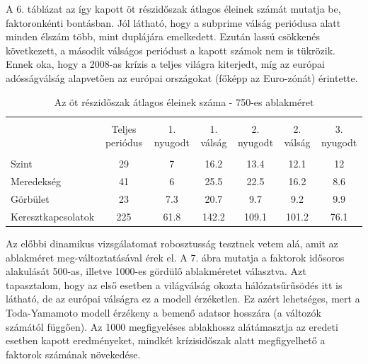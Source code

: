 \documentclass[12pt,bibliography=totoc]{article}
\begin{document}
A 6. táblázat az így kapott öt részidőszak átlagos éleinek számát mutatja be, faktoronkénti bontásban. Jól látható, hogy a subprime válság periódusa alatt minden élszám több, mint duplájára emelkedett. Ezután lassú csökkenés következett, a második válságos periódust a kapott számok nem is tükrözik. Ennek oka, hogy a 2008-as krízis a teljes világra kiterjedt, míg az európai adósságválság alapvetően az európai országokat (főképp az Euro-zónát) érintette. 


\begin{table}[H]
\caption{Az öt részidőszak átlagos éleinek száma - 750-es ablakméret} %
\fontsize{10}{10}\selectfont
\centering%
\begin{tabular}{l | cccccc}%
\hline\hline \\ [-1.5ex]                         %


		& 	Teljes periódus  &	1. nyugodt	&	1. válság& 	2. nyugodt& 	2. válság&	 3. nyugodt \\
\hline \\ [-1.5ex]  
Szint	&		29	&	7	&	16.2	&	13.4	&  	12.1	&	 12\\
Meredekség	&		41	&	6	&	25.5	&	22.5	& 	16.2	& 	8.6\\
Görbület	&	23	&	7.3	&	20.7	&	9.7	& 	9.2	&	 9.9\\
Keresztkapcsolatok	&		225	&	61.8	&	142.2	&	109.1	& 	101.2	& 	76.1\\

\hline            
\end{tabular}
\label{table:nonlin}%
\end{table}

Az előbbi dinamikus vizsgálatomat robosztusság tesztnek vetem alá, amit az ablakméret meg-változtatásával érek el. A 7. ábra mutatja a faktorok idősoros alakulását 500-as, illetve 1000-es gördülő ablakméretet választva. Azt tapasztalom, hogy az első esetben a világválság okozta hálózatsűrűsödés itt is látható, de az európai válságra ez a modell érzéketlen. Ez azért lehetséges, mert a Toda-Yamamoto modell érzékeny a bemenő adatsor hosszára (a változók számától függően). Az 1000 megfigyeléses ablakhossz alátámasztja az eredeti esetben kapott eredményeket, mindkét krízisidőszak alatt megfigyelhető a faktorok számának növekedése.
\end{document}
